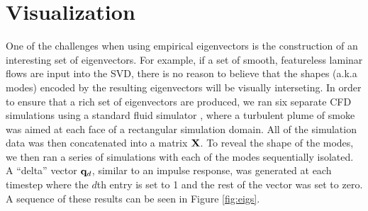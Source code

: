 \documentclass[11pt]{article}
\begin{document}

\section*{Visualization}

One of the challenges when using empirical eigenvectors is the construction of an interesting set of eigenvectors. For example, if a set of smooth, featureless laminar flows are input into the SVD, there is no reason to believe that the shapes (a.k.a modes) encoded by the resulting eigenvectors will be visually interseting. In order to ensure that a rich set of eigenvectors are produced, we ran six separate CFD simulations using a standard fluid simulator \cite{Stam99}, where a turbulent plume of smoke was aimed at each face of a rectangular simulation domain. All of the simulation data was then concatenated into a matrix $\mathbf{X}$. To reveal the shape of the modes, we then ran a series of simulations with each of the modes sequentially isolated. A ``delta'' vector $\mathbf{q}_d$, similar to an impulse response, was generated at each timestep where the $d$th entry is set to 1 and the rest of the vector was set to zero. A sequence of these results can be seen in Figure \ref{fig:eigs}.
\end{document}
